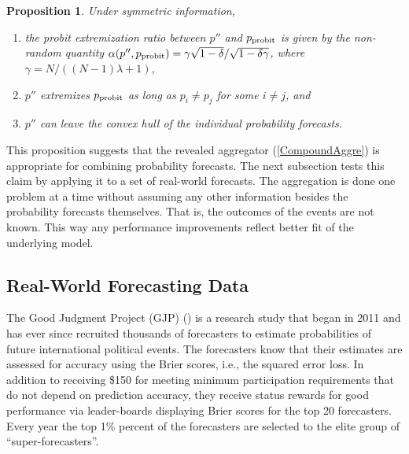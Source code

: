 \documentclass[12pt]{article}
\newtheorem{proposition}[theorem]{Proposition}
\theoremstyle{definition}
\theoremstyle{definition}
\def\probit{p_{\rm probit}}
\begin{document}
\begin{proposition} \label{positiveThm}
Under symmetric information, 
\begin{enumerate}
\item[$(i)$] the probit extremization ratio between $p''$ and $\probit$ is given by the
non-random quantity $\alpha(p'', \probit) =  \gamma \sqrt{1 - \delta}/\sqrt{1-\delta\gamma}$, where $\gamma = N/((N-1)\lambda +1)$,
\item[$(ii)$] $p''$ extremizes $\probit$ as long as $p_i \neq p_j$ for some $i \neq j$,
and
\item[$(iii)$] $p''$ can leave the convex hull
of the individual probability forecasts.
\end{enumerate}
\end{proposition}
This proposition suggests that the revealed aggregator
(\ref{CompoundAggre}) is appropriate for combining probability
forecasts. The next subsection tests this claim by applying it to a set
of real-world forecasts. The aggregation is done one problem at a time
without assuming any other information besides the probability
forecasts themselves. That is, the outcomes of the events are not
known. This way any performance improvements reflect better fit of the
underlying model.



\subsection{Real-World Forecasting Data}
\label{realData}
The Good Judgment Project (GJP) (\citealt{ungar2012good, mellers2014psychological}) is a research study that began in 2011 and has ever since recruited
thousands of forecasters to estimate
probabilities of future international political events.  The forecasters know that their
 estimates are assessed for accuracy using the Brier scores, i.e., the
squared error loss.  
In addition to receiving \$150 for
meeting minimum participation requirements that do not depend on
prediction accuracy, they receive status rewards for good
performance via leader-boards displaying Brier scores for the top 20
forecasters.  
Every year the top 1\% percent of the forecasters are
selected to the elite group of ``super-forecasters''. 
\end{document}
